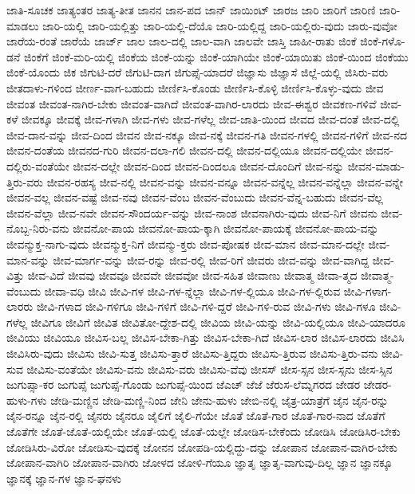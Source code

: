 {ಜಾತಿ-ಸೂಚಕ
ಜಾತ್ಯಂತರ
ಜಾತ್ಯ-ತೀತ
ಜಾನನ
ಜಾನ-ಪದ
ಜಾನ್
ಜಾಯಿಂಟ್
ಜಾರಜ
ಜಾರಿ
ಜಾರಿಗೆ
ಜಾರಿಣಿ
ಜಾರಿ-ಮಾಡಲು
ಜಾರಿ-ಯಲ್ಲಿ
ಜಾರಿ-ಯಲ್ಲಿತ್ತು
ಜಾರಿ-ಯಲ್ಲಿ-ದೆಯೊ
ಜಾರಿ-ಯಲ್ಲಿದ್ದ
ಜಾರಿ-ಯಲ್ಲಿರು-ವುದು
ಜಾರು-ವುವೋ
ಜಾರೆಯ-ರಂತೆ
ಜಾರೆಯೆ
ಜಾರ್ಜ್
ಜಾಲ
ಜಾಲ-ದಲ್ಲಿ
ಜಾಲ-ವಾಗಿ
ಜಾಲವೇ
ಜಾಸ್ತಿ
ಜಾಹೀ-ರಾತು
ಜಿಂಕೆ
ಜಿಂಕೆ-ಗಳೊ-ಡನೆ
ಜಿಂಕೆಗೆ
ಜಿಂಕೆ-ಮರಿ-ಯಲ್ಲಿ
ಜಿಂಕೆಯ
ಜಿಂಕೆ-ಯನ್ನು
ಜಿಂಕೆ-ಯಾಗಿಯೇ
ಜಿಂಕೆ-ಯಾಯಿತು
ಜಿಂಕೆ-ಯಿಂದ
ಜಿಂಕೆಯು
ಜಿಂಕೆ-ಯೊಂದು
ಜಿಕ
ಜಿಗುಟಿ-ದರೆ
ಜಿಗುಟಿ-ದಾಗ
ಜಿಗುಪ್ಸೆ-ಯಾದರೆ
ಜಿಜ್ಞಾಸು
ಜಿಜ್ಞಾಸೆ
ಜಿಲ್ಲೆ-ಯಲ್ಲಿ
ಜಿಸಿರು-ವರು
ಜೀತದಾಳು-ಗಳಿಂದ
ಜೀರ್ಣ-ವಾಗ-ಬಹುದು
ಜೀರ್ಣಿಸಿ-ಕೊಂಡು
ಜೀರ್ಣಿಸಿ-ಕೊಳ್ಳಿ
ಜೀರ್ಣಿಸಿ-ಕೊಳ್ಳು-ವುದು
ಜೀವ
ಜೀವಂತ
ಜೀವಂತ-ನಾಗಿರ-ಬೇಕು
ಜೀವಂತ-ವಾಗಿದೆ
ಜೀವಂತ-ವಾಗಿರ-ಲಾರದು
ಜೀವ-ಈಶ್ವರ
ಜೀವಕಣ-ಗಳಿವೆ
ಜೀವ-ಕಳೆ
ಜೀವಕ್ಕೂ
ಜೀವಕ್ಕೆ
ಜೀವ-ಗಳಾಗಿ
ಜೀವ-ಗಳು
ಜೀವ-ಗಳೆಲ್ಲ
ಜೀವ-ಜಾತಿ-ಯಿಂದ
ಜೀವದ
ಜೀವ-ದಂತೆ
ಜೀವ-ದಲ್ಲಿ
ಜೀವ-ದಾನ-ವನ್ನು
ಜೀವ-ದಿಂದ
ಜೀವನ
ಜೀವ-ನಕ್ಕೂ
ಜೀವ-ನಕ್ಕೆ
ಜೀವನ-ಗತಿ
ಜೀವನ-ಗಳಲ್ಲಿ
ಜೀವನ-ಗಳಿಗೆ
ಜೀವ-ನದ
ಜೀವನ-ದಂತೆಯ
ಜೀವನದ-ಗುರಿ
ಜೀವನ-ದಲಾ-ಗಲಿ
ಜೀವನ-ದಲ್ಲಿ
ಜೀವನ-ದಲ್ಲಿಯೂ
ಜೀವನ-ದಲ್ಲಿಯೇ
ಜೀವನ-ದಲ್ಲಿರು-ವಂತೆಯೇ
ಜೀವನ-ದಲ್ಲೇ
ಜೀವನ-ದಿಂದ
ಜೀವನ-ದಿಂದಲೂ
ಜೀವನ-ದೊಂದಿಗೆ
ಜೀವ-ನನ್ನು
ಜೀವನ-ಮಾಡು-ತ್ತಿರು-ವರು
ಜೀವನ-ರಹಸ್ಯ
ಜೀವ-ನಲ್ಲಿ
ಜೀವನ-ವನ್ನು
ಜೀವನ-ವನ್ನೂ
ಜೀವನ-ವನ್ನೆಲ್ಲ
ಜೀವನ-ವನ್ನೆಲ್ಲಾ
ಜೀವನ-ವನ್ನೇ
ಜೀವನ-ವಲ್ಲ
ಜೀವನ-ವಷ್ಟೆ
ಜೀವ-ನವು
ಜೀವನ-ವೆಂಬ
ಜೀವನ-ವೆಂಬುದು
ಜೀವನ-ವೆನ್ನ-ಬಹುದು
ಜೀವನ-ವೆಲ್ಲ
ಜೀವನ-ವೆಲ್ಲಾ
ಜೀವ-ನವೇ
ಜೀವನ-ಸೌಂದರ್ಯ-ವನ್ನು
ಜೀವ-ನಾಂಶ
ಜೀವನಾಗಿರು-ವುದು
ಜೀವ-ನಿಗೆ
ಜೀವನು
ಜೀವ-ನೊಬ್ಬ-ನಿರು-ವನು
ಜೀವನೋ-ಪಾಯ
ಜೀವನೋ-ಪಾಯ-ಕ್ಕಾಗಿ
ಜೀವನೋ-ಪಾಯಕ್ಕೆ
ಜೀವನೋ-ಪಾಯ-ವನ್ನು
ಜೀವನ್ಮುಕ್ತ-ನಾಗು-ವುದು
ಜೀವನ್ಮುಕ್ತ-ನಿಗೆ
ಜೀವನ್ಮು-ಕ್ತರು
ಜೀವ-ಪೋಷಕ
ಜೀವ-ಮಾನ
ಜೀವ-ಮಾನ-ದಲ್ಲೇ
ಜೀವ-ಮಾನ-ವನ್ನು
ಜೀವ-ಮಾರ್ಗ-ವನ್ನು
ಜೀವ-ರನ್ನು
ಜೀವ-ರಲ್ಲಿ
ಜೀವ-ರಿಗೆ
ಜೀವರು
ಜೀವ-ವನ್ನು
ಜೀವ-ವಾಗಿದ್ದ
ಜೀವ-ವಿತ್ತು
ಜೀವ-ವಿದೆ
ಜೀವವು
ಜೀವವೂ
ಜೀವವೇ
ಜೀವವೋ
ಜೀವ-ಸಹಿತ
ಜೀವಾಣು
ಜೀವಾತ್ಮ
ಜೀವಾ-ತ್ಮದ
ಜೀವಾತ್ಮ-ವೆಂಬುದು
ಜೀವಾ-ವಧಿ
ಜೀವಿ
ಜೀವಿ-ಗಳ
ಜೀವಿ-ಗಳ-ನ್ನೆಲ್ಲಾ
ಜೀವಿ-ಗಳ-ಲ್ಲಿಯೂ
ಜೀವಿ-ಗಳ-ಲ್ಲಿರುವ
ಜೀವಿ-ಗಳಾಗ-ಲಾರರು
ಜೀವಿ-ಗಳಾದ
ಜೀವಿ-ಗಳಿಗೂ
ಜೀವಿ-ಗಳಿಗೆ
ಜೀವಿ-ಗಳಿ-ದ್ದರೆ
ಜೀವಿ-ಗಳಿ-ರುವ
ಜೀವಿ-ಗಳು
ಜೀವಿ-ಗಳೂ
ಜೀವಿ-ಗಳೆಲ್ಲ
ಜೀವಿಗೂ
ಜೀವಿಗೆ
ಜೀವಿತ
ಜೀವಿತೋ-ದ್ದೇಶ-ದಲ್ಲಿ
ಜೀವಿಯ
ಜೀವಿ-ಯನ್ನು
ಜೀವಿ-ಯಲ್ಲಿಯೂ
ಜೀವಿ-ಯಾದರೂ
ಜೀವಿಯು
ಜೀವಿಯೂ
ಜೀವಿಸ-ಬಲ್ಲ
ಜೀವಿಸ-ಬೇಕಾ-ಗಿತ್ತು
ಜೀವಿಸ-ಬೇಕಾ-ಗಿದೆ
ಜೀವಿಸ-ಲಾರ
ಜೀವಿಸ-ಲಾರದು
ಜೀವಿಸಿ
ಜೀವಿಸಿರು-ವುದು
ಜೀವಿಸು
ಜೀವಿ-ಸುತ್ತ
ಜೀವಿಸು-ತ್ತಾರೆ
ಜೀವಿಸು-ತ್ತಿದ್ದರು
ಜೀವಿಸು-ತ್ತಿರುವ
ಜೀವಿಸು-ತ್ತಿರು-ವನು
ಜೀವಿ-ಸುವ
ಜೀವಿಸು-ವಂತೆಯೇ
ಜೀವಿಸು-ವನು
ಜೀವಿಸು-ವರು
ಜೀವಿಸು-ವೆವು
ಜೀಸಸ್
ಜೀಸ-ಸ್ಸನ
ಜೀಸ-ಸ್ಸನು
ಜೀಸ-ಸ್ಸಿನ
ಜುಗುಪ್ಸಾ-ಕರ
ಜುಗುಪ್ಸೆ
ಜುಗುಪ್ಸೆ-ಗೊಂಡು
ಜುಗುಪ್ಸೆ-ಯಿಂದ
ಜೆಎಚ್
ಜೆಜೆ
ಜೆರುಸ-ಲೆಮ್ನಗರದ
ಜೇಡರ
ಜೇಡರ-ಹುಳು-ಗಳು
ಜೇಡಿ-ಮಣ್ಣಿನ
ಜೇಡಿ-ಮಣ್ಣಿ-ನಿಂದ
ಜೇನಿ
ಜೇನು-ಹುಳು
ಜೇಬಿ-ನಲ್ಲಿ
ಜೈತ್ರ-ಯಾತ್ರೆಗೆ
ಜೈನ
ಜೈನ-ರನ್ನು
ಜೈನ-ರನ್ನೂ
ಜೈನ-ರಲ್ಲಿ
ಜೈನರು
ಜೈನರೂ
ಜೈಲಿಗೆ
ಜೈಲಿ-ಗೆಯೇ
ಜೊತೆ
ಜೊತೆ-ಗಾರ
ಜೊತೆ-ಗಾರ-ನಾದ
ಜೊತೆಗೆ
ಜೊತೆಗೇ
ಜೊತೆ-ಜೊತೆ-ಯಲ್ಲಿಯೇ
ಜೊತೆ-ಯಲ್ಲಿ
ಜೊತೆ-ಯಲ್ಲೇ
ಜೋಡಿಸ-ಬೇಕೆಂದು
ಜೋಡಿಸಿ
ಜೋಡಿಸಿರ-ಬೇಕು
ಜೋಡಿಸಿರು-ವಿರೋ
ಜೋಡಿಸು-ವುದಕ್ಕೆ
ಜೋನನ
ಜೋಪಡಿ-ಯಲ್ಲಿದ್ದು-ದನ್ನು
ಜೋಪಾನ
ಜೋಪಾನ-ವಾಗಿರ-ಬೇಕು
ಜೋಪಾನ-ವಾಗಿರಿ
ಜೋಪಾನ-ವಾಗಿರು
ಜೋಳದ
ಜೋಳಿ-ಗೆಯೂ
ಜ್ಞಾತೃ
ಜ್ಞಾತೃ-ವಾಗುವು-ದಿಲ್ಲ
ಜ್ಞಾನ
ಜ್ಞಾನಕ್ಕೂ
ಜ್ಞಾನಕ್ಕೆ
ಜ್ಞಾನ-ಗಳ
ಜ್ಞಾನ-ಘನಳು
}
